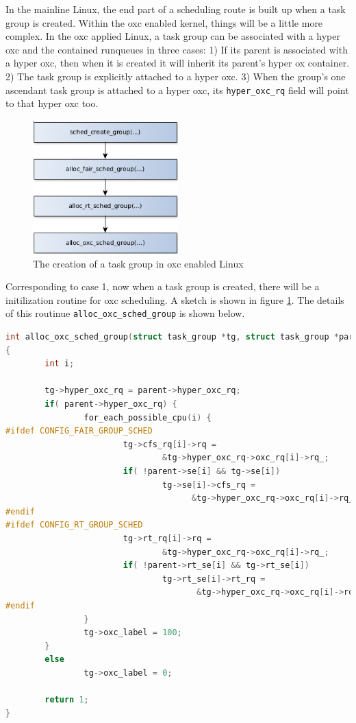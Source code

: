 In the mainline Linux, the end part of a scheduling route is built up when
a task group is created. Within the oxc enabled kernel, things will be a 
little more complex. In the oxc applied Linux, a task group can be associated 
with a hyper oxc and the contained runqueues in three cases: 1) If its parent 
is associated with a hyper oxc, then when it is created it will inherit its 
parent's hyper ox container. 2) The task group is explicitly attached to
a hyper oxc. 3) When the group's one ascendant task group is attached to 
a hyper oxc, its \texttt{hyper\_oxc\_rq} field will point to that hyper 
oxc too. 

\begin{figure}[htbp]
        \centering
        \includegraphics[height=0.25\textheight,width=0.5\textwidth]{images/tg_creation_oxc}
        \caption{The creation of a task group in oxc enabled Linux}
        \label{fig:tg_creation_oxc}
\end{figure}

Corresponding to case 1, now when a task group is created, there 
will be a initilization routine for oxc scheduling. A sketch is shown in 
figure \ref{fig:tg_creation_oxc}. The details of this routinue 
\texttt{alloc\_oxc\_sched\_group} is shown below. 

\begin{lstlisting}[language=C,
        caption={OXC scheduling related initilization 
					during task group creation}]
int alloc_oxc_sched_group(struct task_group *tg, struct task_group *parent)
{
        int i;

        tg->hyper_oxc_rq = parent->hyper_oxc_rq;
        if( parent->hyper_oxc_rq) {
                for_each_possible_cpu(i) {
#ifdef CONFIG_FAIR_GROUP_SCHED
                        tg->cfs_rq[i]->rq =
                                &tg->hyper_oxc_rq->oxc_rq[i]->rq_;
                        if( !parent->se[i] && tg->se[i])
                                tg->se[i]->cfs_rq =
                                      &tg->hyper_oxc_rq->oxc_rq[i]->rq_.cfs;
#endif
#ifdef CONFIG_RT_GROUP_SCHED
                        tg->rt_rq[i]->rq =
                                &tg->hyper_oxc_rq->oxc_rq[i]->rq_;
                        if( !parent->rt_se[i] && tg->rt_se[i])
                                tg->rt_se[i]->rt_rq =
                                       &tg->hyper_oxc_rq->oxc_rq[i]->rq_.rt;
#endif
                }
                tg->oxc_label = 100;
        }
        else
                tg->oxc_label = 0;

        return 1;
}
\end{lstlisting}

